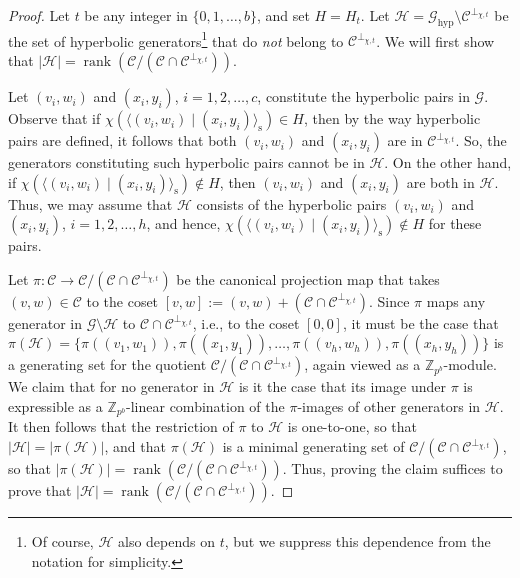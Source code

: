 \documentclass{article}
\DeclareMathOperator{\rank}{rank}
\theoremstyle{remark}
\theoremstyle{definition}
\numberwithin{equation}{section}
\begin{document}
 \begin{proof}
Let $t$ be any integer in $\{0,1,\ldots,b\}$, and set $H = H_t$. Let $\mathcal{H} = \mathcal{G}_{\text{hyp}} \setminus \mathcal{C}^{\perp_{\chi,t}}$ be the set of hyperbolic generators\footnote{Of course, $\mathcal{H}$ also depends on $t$, but we suppress this dependence from the notation for simplicity.} that do \emph{not} belong to $\mathcal{C}^{\perp_{\chi,t}}$. We will first show that $|\mathcal{H}| = \rank(\mathcal{C} / (\mathcal{C} \cap \mathcal{C}^{\perp_{\chi,t}}))$.

Let $(v_i,w_i)$ and $(x_i,y_i)$, $i=1,2,\ldots,c$, constitute the hyperbolic pairs in $\mathcal{G}$. Observe that if $\chi( \langle (v_i,w_i) \mid (x_i,y_i) \rangle_{\text{s}}) \in H$, then by the way hyperbolic pairs are defined, it follows that both $(v_i,w_i)$ and $(x_i,y_i)$ are in $\mathcal{C}^{\perp_{\chi,t}}$. So, the generators constituting such hyperbolic pairs cannot be in $\mathcal{H}$. On the other hand, if $\chi( \langle (v_i,w_i) \mid (x_i,y_i) \rangle_{\text{s}}) \notin H$, then $(v_i,w_i)$ and $(x_i,y_i)$ are both in $\mathcal{H}$. Thus, we may assume that $\mathcal{H}$ consists of the hyperbolic pairs $(v_i,w_i)$ and $(x_i,y_i)$, $i=1,2,\ldots,h$, and hence, $\chi( \langle (v_i,w_i) \mid (x_i,y_i) \rangle_{\text{s}}) \notin H$ for these pairs.

Let $\pi : \mathcal{C}  \to \mathcal{C}/(\mathcal{C} \cap \mathcal{C}^{\perp_{\chi,t}})$ be the canonical projection map that takes $(v,w) \in \mathcal{C}$ to the coset $[v,w] := (v,w) + (\mathcal{C} \cap \mathcal{C}^{\perp_{\chi,t}})$. Since $\pi$ maps any generator in $\mathcal{G} \setminus \mathcal{H}$ to $\mathcal{C} \cap \mathcal{C}^{\perp_{\chi,t}}$, i.e., to the coset $[0,0]$, it must be the case that $\pi(\mathcal{H}) = \{\pi((v_1,w_1)), \pi((x_1,y_1)), \ldots, \pi((v_h,w_h)), \pi((x_h,y_h))\}$ is a generating set for the quotient $\mathcal{C} / (\mathcal{C} \cap \mathcal{C}^{\perp_{\chi,t}})$, again viewed as a $\mathbb{Z}_{p^b}$-module. We claim that for no generator in $\mathcal{H}$ is it the case that its image under $\pi$ is expressible as a $\mathbb{Z}_{p^b}$-linear combination of the $\pi$-images of other generators in $\mathcal{H}$. It then follows that the restriction of $\pi$ to $\mathcal{H}$ is one-to-one, so that $|\mathcal{H}| = |\pi(\mathcal{H})|$, and that $\pi(\mathcal{H})$ is a minimal generating set of $\mathcal{C} / (\mathcal{C} \cap \mathcal{C}^{\perp_{\chi,t}})$, so that $|\pi(\mathcal{H})| = \rank(\mathcal{C} / (\mathcal{C} \cap \mathcal{C}^{\perp_{\chi,t}}))$. Thus, proving the claim suffices to prove that $|\mathcal{H}| = \rank(\mathcal{C} / (\mathcal{C} \cap \mathcal{C}^{\perp_{\chi,t}}))$.


\end{proof}
\end{document}
